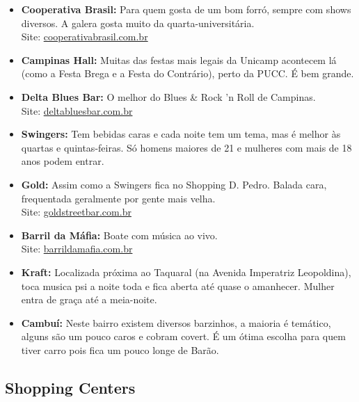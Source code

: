 \begin{itemize}
\item   \textbf{Cooperativa Brasil:} Para quem gosta de um bom forró, sempre com
        shows diversos. A galera gosta muito da quarta-universitária.
        \\Site: \url{cooperativabrasil.com.br}

\item   \textbf{Campinas Hall:} Muitas das festas mais legais da Unicamp
        acontecem lá (como a Festa Brega e a Festa do Contrário), perto da PUCC.
        É bem grande.

\item   \textbf{Delta Blues Bar:} O melhor do Blues \& Rock 'n Roll de
        Campinas.
        \\Site: \url{deltabluesbar.com.br}

\item   \textbf{Swingers:} Tem bebidas caras e cada noite tem um tema, mas
        é melhor às quartas e quintas-feiras. Só homens maiores de 21 e mulheres
        com mais de 18 anos podem entrar.

\item   \textbf{Gold:} Assim como a Swingers fica no Shopping D. Pedro. Balada
        cara, frequentada geralmente por gente mais velha.
        \\Site: \url{goldstreetbar.com.br}

\item   \textbf{Barril da Máfia:} Boate com música ao vivo.
        \\Site: \url{barrildamafia.com.br}

\item   \textbf{Kraft:} Localizada próxima ao Taquaral (na Avenida Imperatriz
        Leopoldina), toca musica psi a noite toda e fica aberta até quase
        o amanhecer. Mulher entra de graça até a meia-noite.

\item   \textbf{Cambuí:} Neste bairro existem diversos barzinhos, a maioria
        é temático, alguns são um pouco caros e cobram covert. É um ótima escolha
        para quem tiver carro pois fica um pouco longe de Barão.

\end{itemize}

\subsection{Shopping Centers}

